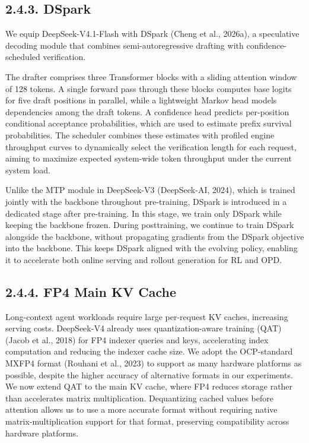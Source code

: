 \documentclass[
  10
]{article}
\begin{document}
\subsection{2.4.3. DSpark}\label{dspark}

We equip DeepSeek-V4.1-Flash with DSpark (Cheng et al., 2026a), a
speculative decoding module that combines semi-autoregressive drafting
with confidence-scheduled verification.

The drafter comprises three Transformer blocks with a sliding attention
window of 128 tokens. A single forward pass through these blocks
computes base logits for five draft positions in parallel, while a
lightweight Markov head models dependencies among the draft tokens. A
confidence head predicts per-position conditional acceptance
probabilities, which are used to estimate prefix survival probabilities.
The scheduler combines these estimates with profiled engine throughput
curves to dynamically select the verification length for each request,
aiming to maximize expected system-wide token throughput under the
current system load.

Unlike the MTP module in DeepSeek-V3 (DeepSeek-AI, 2024), which is
trained jointly with the backbone throughout pre-training, DSpark is
introduced in a dedicated stage after pre-training. In this stage, we
train only DSpark while keeping the backbone frozen. During
posttraining, we continue to train DSpark alongside the backbone,
without propagating gradients from the DSpark objective into the
backbone. This keeps DSpark aligned with the evolving policy, enabling
it to accelerate both online serving and rollout generation for RL and
OPD.

\subsection{2.4.4. FP4 Main KV Cache}\label{fp4-main-kv-cache}

Long-context agent workloads require large per-request KV caches,
increasing serving costs. DeepSeek-V4 already uses quantization-aware
training (QAT) (Jacob et al., 2018) for FP4 indexer queries and keys,
accelerating index computation and reducing the indexer cache size. We
adopt the OCP-standard MXFP4 format (Rouhani et al., 2023) to support as
many hardware platforms as possible, despite the higher accuracy of
alternative formats in our experiments. We now extend QAT to the main KV
cache, where FP4 reduces storage rather than accelerates matrix
multiplication. Dequantizing cached values before attention allows us to
use a more accurate format without requiring native
matrix-multiplication support for that format, preserving compatibility
across hardware platforms.
\end{document}

